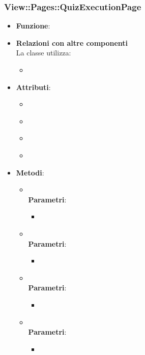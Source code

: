 \subsubsection{View::Pages::QuizExecutionPage}
\begin{itemize}
\item\textbf{Funzione}:
\item\textbf{Relazioni con altre componenti}\\
La classe utilizza:
	\begin{itemize}
		\item
	\end{itemize}
\item\textbf{Attributi}:
	\begin{itemize}
		\item\code{}\\
		\item\code{}\\
		\item\code{}\\
		\item\code{}\\
	\end{itemize}
\item\textbf{Metodi}:
	\begin{itemize}
		\item\code{}\\
		\textbf{Parametri}:
			\begin{itemize}
				\item\code{}\\
			\end{itemize}
		\item\code{}\\
		\textbf{Parametri}:
			\begin{itemize}
				\item\code{}\\
			\end{itemize}
		\item\code{}\\
		\textbf{Parametri}:
			\begin{itemize}
				\item\code{}\\
			\end{itemize}
		\item\code{}\\
		\textbf{Parametri}:
			\begin{itemize}
				\item\code{}\\
			\end{itemize}
	\end{itemize}
\end{itemize}

